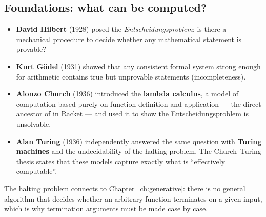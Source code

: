 \subsection{Foundations: what can be computed?}
\begin{itemize}
  \item \textbf{David Hilbert} (1928) posed the \emph{Entscheidungsproblem}: is there a mechanical procedure to decide whether any mathematical statement is provable?
  \item \textbf{Kurt G\"odel} (1931) showed that any consistent formal system strong enough for arithmetic contains true but unprovable statements (incompleteness).
  \item \textbf{Alonzo Church} (1936) introduced the \textbf{lambda calculus}, a model of computation based purely on function definition and application --- the direct ancestor of  in Racket --- and used it to show the Entscheidungsproblem is unsolvable.
  \item \textbf{Alan Turing} (1936) independently answered the same question with \textbf{Turing machines} and the undecidability of the halting problem. The Church--Turing thesis states that these models capture exactly what is ``effectively computable''.
\end{itemize}

\begin{aside}
The halting problem connects to Chapter~\ref{ch:generative}: there is no
general algorithm that decides whether an arbitrary function terminates on a
given input, which is why termination arguments must be made case by case.
\end{aside}

